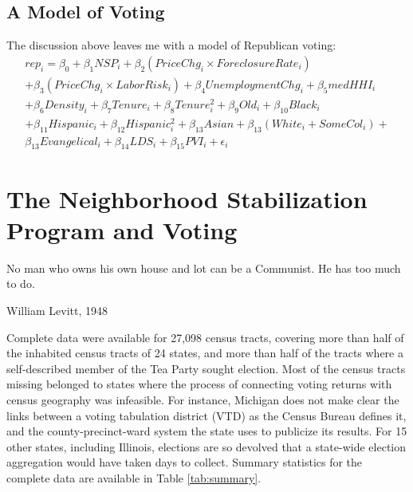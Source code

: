 \documentclass[12pt,oneside]{psthesis}
\begin{document}
\hypertarget{model}{%
\section{A Model of Voting}\label{model}}

The discussion above leaves me with a model of Republican voting:
\begin{multline}
rep_i = \beta_0 + \beta_1NSP_i + \beta_2(PriceChg_i \times ForeclosureRate_i) \\ + \beta_3(PriceChg_i \times LaborRisk_i) + \beta_4UnemploymentChg_i + \beta_5medHHI_i \\ + \beta_6Density_i +
\beta_7Tenure_i + \beta_8Tenure^2_i + \beta_9Old_i + \beta_{10}Black_i \\ + \beta_{11}Hispanic_i + \beta_{12}Hispanic^2_i + \beta_{13}Asian + \beta_{13}(White_i + SomeCol_i) + \\ \beta_{13}Evangelical_i + \beta_{14}LDS_i + \beta_{15}PVI_i + \epsilon_i
\label{eq:model}
\end{multline}
\hypertarget{outcome}{%
\chapter{The Neighborhood Stabilization Program and Voting}\label{outcome}}

\epigraph{No man who owns his own house and lot can be a Communist. He has too much to do.}{William Levitt, 1948}

Complete data were available for 27,098 census tracts, covering more than half of the inhabited census tracts of 24 states, and more than half of the tracts where a self-described member of the Tea Party sought election.
Most of the census tracts missing belonged to states where the process of connecting voting returns with census geography was infeasible.
For instance, Michigan does not make clear the links between a voting tabulation district (VTD) as the Census Bureau defines it, and the county-precinct-ward system the state uses to publicize its results.
For 15 other states, including Illinois, elections are so devolved that a state-wide election aggregation would have taken days to collect.
Summary statistics for the complete data are available in Table \ref{tab:summary}.
\end{document}
